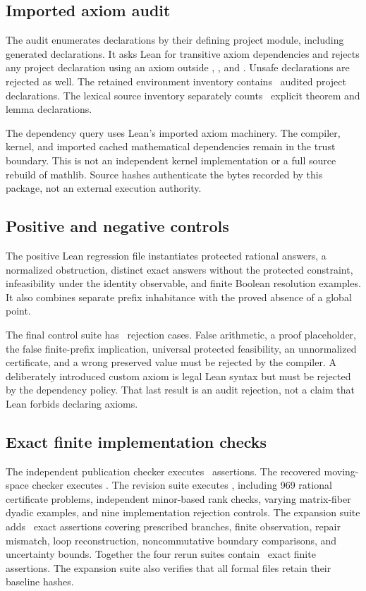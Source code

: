 \documentclass[11pt]{article}
\begin{document}
\subsection{Imported axiom audit}
The audit enumerates declarations by their defining project module, including generated declarations. It asks Lean for transitive axiom dependencies and rejects any project declaration using an axiom outside , , and . Unsafe declarations are rejected as well. The retained environment inventory contains \EditionAuditedDeclarations\ audited project declarations. The lexical source inventory separately counts \EditionFormalTheorems\ explicit theorem and lemma declarations.

The dependency query uses Lean's imported axiom machinery. The compiler, kernel, and imported cached mathematical dependencies remain in the trust boundary. This is not an independent kernel implementation or a full source rebuild of mathlib. Source hashes authenticate the bytes recorded by this package, not an external execution authority.

\subsection{Positive and negative controls}
The positive Lean regression file instantiates protected rational answers, a normalized obstruction, distinct exact answers without the protected constraint, infeasibility under the identity observable, and finite Boolean resolution examples. It also combines separate prefix inhabitance with the proved absence of a global point.

The final control suite has \EditionNegativeControls\ rejection cases. False arithmetic, a proof placeholder, the false finite-prefix implication, universal protected feasibility, an unnormalized certificate, and a wrong preserved value must be rejected by the compiler. A deliberately introduced custom axiom is legal Lean syntax but must be rejected by the dependency policy. That last result is an audit rejection, not a claim that Lean forbids declaring axioms.

\subsection{Exact finite implementation checks}
The independent publication checker executes \EditionOriginalChecks\ assertions. The recovered moving-space checker executes \EditionRecoveredChecks. The revision suite executes \EditionRevisionChecks, including 969 rational certificate problems, independent minor-based rank checks, varying matrix-fiber dyadic examples, and nine implementation rejection controls. The expansion suite adds \EditionExpansionChecks\ exact assertions covering prescribed branches, finite observation, repair mismatch, loop reconstruction, noncommutative boundary comparisons, and uncertainty bounds. Together the four rerun suites contain \EditionTotalChecks\ exact finite assertions. The expansion suite also verifies that all formal files retain their baseline hashes.
\end{document}
